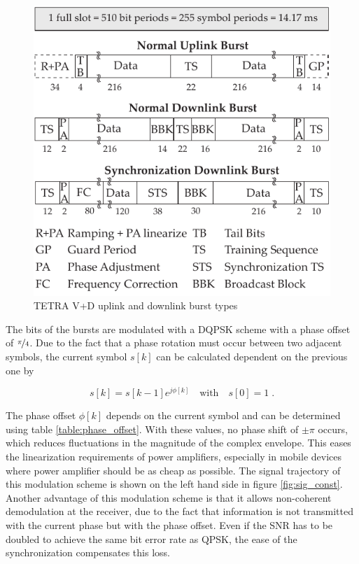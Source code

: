 \begin{figure}[htb]
	\centering
		\includegraphics[]{../kapitel04/figures/TETRA_bursts.pdf}
	\caption{TETRA V+D uplink and downlink burst types}
	\label{fig:TETRA_bursts}
\end{figure}

The bits of the bursts are modulated with a \ac{DQPSK} scheme with a phase offset of $\nicefrac{\pi}{4}$. Due to the fact that a phase rotation must occur between two adjacent symbols, the current symbol $s[k]$ can be calculated dependent on the previous one by

\begin{equation}
		s[k]=s[k-1]e^{j\phi[k]} \quad \text{with} \quad s[0]=1\;.
\end{equation}

The phase offset $\phi[k]$ depends on the current symbol and can be determined using table \ref{table:phase_offset}. With these values, no phase shift of $\pm \pi$ occurs, which reduces fluctuations in the magnitude of the complex envelope. This eases the linearization requirements of power amplifiers, especially in mobile devices where power amplifier should be as cheap as possible. The signal trajectory of this modulation scheme is shown on the left hand side in figure \ref{fig:sig_const}. Another advantage of this modulation scheme is that it allows non-coherent demodulation at the receiver, due to the fact that information is not transmitted with the current phase but with the phase offset. Even if the \ac{SNR} has to be doubled to achieve the same bit error rate as QPSK, the ease of the synchronization compensates this loss.


